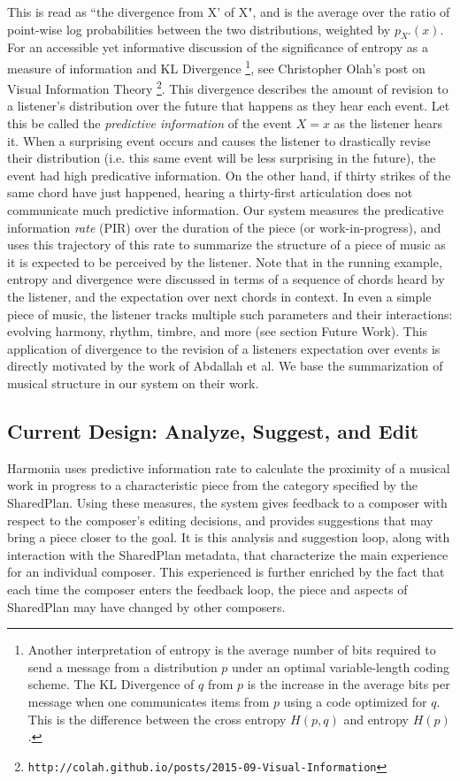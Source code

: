 \documentclass[final,authoryear,5p,times,twocolumn]{elsarticle}
\begin{document}
\noindent This is read as ``the divergence from X' of X", and is the average over the ratio of point-wise log probabilities between the two distributions, weighted by $p_{X'}(x)$. For an accessible yet informative discussion of the significance of entropy as a measure of information and KL Divergence  \footnote{Another interpretation of entropy is the average number of bits required to send a message from a distribution $p$ under an optimal variable-length coding scheme. The KL Divergence of $q$ from $p$ is the increase in the average bits per message when one communicates items from $p$ using a code optimized for $q$. This is the difference between the cross entropy $H(p,q)$ and entropy $H(p)$.}, see Christopher Olah's post on Visual Information Theory \footnote{\texttt{http://colah.github.io/posts/2015-09-Visual-Information}}. This divergence describes the amount of revision to a listener's distribution over the future that happens as they hear each event. Let this be called the \textit{predictive information} of the event $X=x$ as the listener hears it. When a surprising event occurs and causes the listener to drastically revise their distribution (i.e. this same event will be less surprising in the future), the event had high predicative information. On the other hand, if thirty strikes of the same chord have just happened, hearing a thirty-first articulation does not communicate much predictive information. Our system measures the predicative information \textit{rate} (PIR) over the duration of the piece (or work-in-progress), and uses this trajectory of this rate to summarize the structure of a piece of music as it is expected to be perceived by the listener. Note that in the running example, entropy and divergence were discussed in terms of a sequence of chords heard by the listener, and the expectation over next chords in context. In even a simple piece of music, the listener tracks multiple such parameters and their interactions: evolving harmony, rhythm, timbre, and more (see section Future Work). This application of divergence to the revision of a listeners expectation over events is directly motivated by the work of  Abdallah et al. We base the summarization of musical structure in our system on their work.

\subsection{Current Design: Analyze, Suggest, and Edit}

Harmonia uses predictive information rate to calculate the proximity of a musical work in progress to a characteristic piece from the category specified by the SharedPlan. Using these measures, the system gives feedback to a composer with respect to the composer's editing decisions, and provides suggestions that may bring a piece closer to the goal. It is this analysis and suggestion loop, along with interaction with the SharedPlan metadata, that characterize the main experience for an individual composer. This experienced is further enriched by the fact that each time the composer enters the feedback loop, the piece and aspects of SharedPlan may have changed by other composers.
\end{document}
